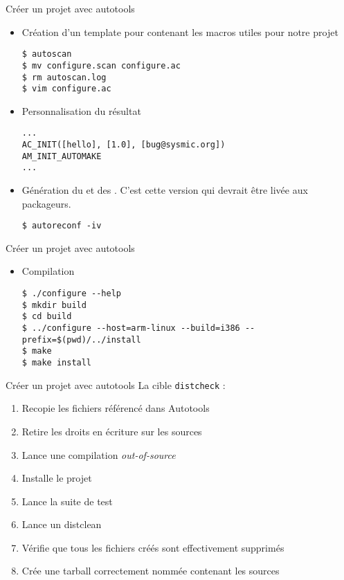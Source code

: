 \begin{frame}[fragile=singleslide]{Créer un projet avec autotools}
  \begin{itemize}
  \item  Création  d'un  template  pour   contenant  les
    macros utiles pour notre projet
\begin{lstlisting}
$ autoscan
$ mv configure.scan configure.ac
$ rm autoscan.log
$ vim configure.ac
\end{lstlisting}
  \item Personnalisation du résultat
\begin{lstlisting}
...
AC_INIT([hello], [1.0], [bug@sysmic.org])
AM_INIT_AUTOMAKE
...
\end{lstlisting}
  \item      Génération      du            et      des
    . C'est cette version qui devrait être livée aux
    packageurs.
\begin{lstlisting}
$ autoreconf -iv
\end{lstlisting} %
  \end{itemize}
\end{frame}

\begin{frame}[fragile=singleslide]{Créer un projet avec autotools}
  \begin{itemize}
  \item Compilation
\begin{lstlisting}
$ ./configure --help
$ mkdir build
$ cd build
$ ../configure --host=arm-linux --build=i386 --prefix=$(pwd)/../install
$ make
$ make install
\end{lstlisting} %
  \end{itemize}
\end{frame}

\begin{frame}[fragile=singleslide]{Créer un projet avec autotools}
  La cible \verb+distcheck+ :
  \begin{enumerate}
  \item Recopie les fichiers référencé dans Autotools
  \item Retire les droits en écriture sur les sources
  \item Lance une compilation \emph{out-of-source}
  \item Installe le projet
  \item Lance la suite de test
  \item Lance un distclean
  \item Vérifie que tous les fichiers créés sont effectivement supprimés
  \item Crée une tarball correctement nommée contenant les sources
  \end{enumerate}
\end{frame}

